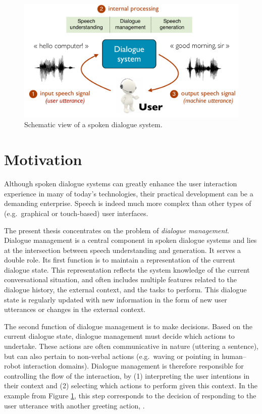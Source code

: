 \begin{figure}[ht]
\center
\includegraphics[scale=0.46]{imgs/basicsds.pdf}
\caption{Schematic view of a spoken dialogue system.}
\label{fig:basicsds}
\end{figure}

\section{Motivation}

Although spoken dialogue systems can greatly enhance the user interaction experience in many of today's technologies, their practical development can be a demanding enterprise. Speech is indeed much more complex than other types of (e.g.\ graphical or touch-based) user interfaces.

The present thesis concentrates on the problem of \textit{dialogue management}.  Dialogue management is a central component in spoken dialogue systems and lies at the intersection between speech understanding and generation.  It serves a double role. Its first function is to maintain a representation of the current dialogue state. This representation reflects the system knowledge of the current conversational situation, and often includes multiple features related to the dialogue history, the external context, and the tasks to perform.  This dialogue state is regularly updated with new information in the form of new user utterances or changes in the external context. 

The second function of dialogue management is to make decisions.  Based on the current dialogue state, dialogue management must decide which actions to undertake. These actions are often communicative in nature (uttering a sentence), but can also pertain to non-verbal actions (e.g.\ waving or pointing in human--robot interaction domains).  Dialogue management is therefore responsible for controlling the flow of the interaction, by (1) interpreting the user intentions in their context and (2) selecting which actions to perform given this context. In the example from Figure \ref{fig:basicsds}, this step corresponds to the decision of responding to the user utterance  with another greeting action, . 

